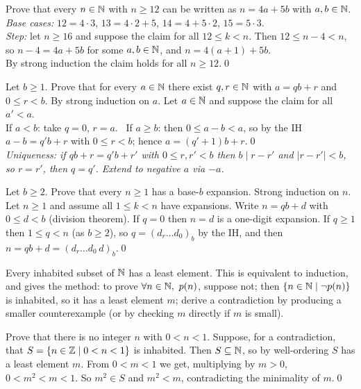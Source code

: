 \begin{hexample}
Prove that every $n\in\mathbb{N}$ with $n\ge12$ can be written as $n=4a+5b$ with $a,b\in\mathbb{N}$.
\solution
\emph{Base cases:} $12=4\cdot3$, $13=4\cdot2+5$, $14=4+5\cdot2$, $15=5\cdot3$.\\
\emph{Step:} let $n\ge16$ and suppose the claim for all $12\le k<n$. Then $12\le n-4<n$, so $n-4=4a+5b$ for some $a,b\in\mathbb{N}$, and $n=4(a+1)+5b$.\\
By strong induction the claim holds for all $n\ge12$.\qed
\end{hexample}

\begin{hexample}
Let $b\ge1$. Prove that for every $a\in\mathbb{N}$ there exist $q,r\in\mathbb{N}$ with $a=qb+r$ and $0\le r<b$.
\solution
By strong induction on $a$. Let $a\in\mathbb{N}$ and suppose the claim for all $a'<a$.\\
If $a<b$: take $q=0$, $r=a$. \ If $a\ge b$: then $0\le a-b<a$, so by the IH $a-b=q'b+r$ with $0\le r<b$; hence $a=(q'+1)b+r$.\qed\\
\emph{Uniqueness: if $qb+r=q'b+r'$ with $0\le r,r'<b$ then $b\mid r-r'$ and $|r-r'|<b$, so $r=r'$, then $q=q'$. Extend to negative $a$ via $-a$.}
\end{hexample}

\begin{hexample}\label{ex:baseb}
Let $b\ge2$. Prove that every $n\ge1$ has a base-$b$ expansion.
\solution
Strong induction on $n$. Let $n\ge1$ and assume all $1\le k<n$ have expansions. Write $n=qb+d$ with $0\le d<b$ (division theorem). If $q=0$ then $n=d$ is a one-digit expansion. If $q\ge1$ then $1\le q<n$ (as $b\ge2$), so $q=(d_r\dots d_0)_b$ by the IH, and then $n=qb+d=(d_r\dots d_0\,d)_b$.\qed
\end{hexample}

\begin{key}
Every inhabited subset of $\mathbb{N}$ has a least element. This is equivalent to induction, and gives the  method: to prove $\forall n\in\mathbb{N},\ p(n)$, suppose not; then $\{n\in\mathbb{N}\mid\neg p(n)\}$ is inhabited, so it has a least element $m$; derive a contradiction by producing a smaller counterexample (or by checking $m$ directly if $m$ is small).
\end{key}

\begin{hexample}
Prove that there is no integer $n$ with $0<n<1$.
\solution
Suppose, for a contradiction, that $S=\{n\in\mathbb{Z}\mid 0<n<1\}$ is inhabited. Then $S\subseteq\mathbb{N}$, so by well-ordering $S$ has a least element $m$. From $0<m<1$ we get, multiplying by $m>0$, $0<m^2<m<1$. So $m^2\in S$ and $m^2<m$, contradicting the minimality of $m$.\qed
\end{hexample}

